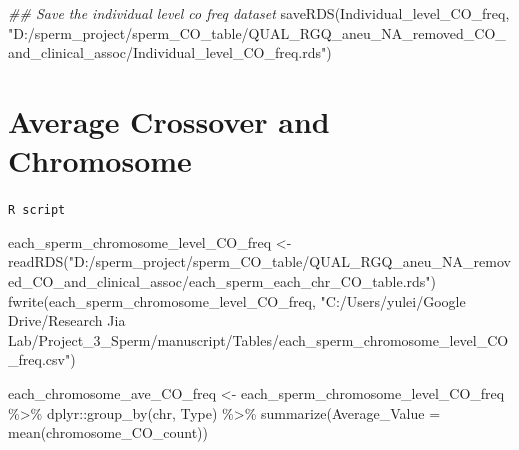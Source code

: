 \documentclass[
  letterpaper,
  DIV=11,
  numbers=noendperiod]{scrreprt}
\newenvironment{Shaded}{\begin{snugshade}}{\end{snugshade}}
\newcommand{\AttributeTok}[1]{\textcolor[rgb]{0.40,0.45,0.13}{#1}}
\newcommand{\DocumentationTok}[1]{\textcolor[rgb]{0.37,0.37,0.37}{\textit{#1}}}
\newcommand{\FunctionTok}[1]{\textcolor[rgb]{0.28,0.35,0.67}{#1}}
\newcommand{\NormalTok}[1]{\textcolor[rgb]{0.00,0.23,0.31}{#1}}
\newcommand{\OtherTok}[1]{\textcolor[rgb]{0.00,0.23,0.31}{#1}}
\newcommand{\SpecialCharTok}[1]{\textcolor[rgb]{0.37,0.37,0.37}{#1}}
\newcommand{\StringTok}[1]{\textcolor[rgb]{0.13,0.47,0.30}{#1}}
\begin{document}
\begin{codelisting}
\begin{Shaded}
\begin{Highlighting}[]
\DocumentationTok{\#\# Save the individual level co freq dataset}
\FunctionTok{saveRDS}\NormalTok{(Individual\_level\_CO\_freq, }\StringTok{"D:/sperm\_project/sperm\_CO\_table/QUAL\_RGQ\_aneu\_NA\_removed\_CO\_and\_clinical\_assoc/Individual\_level\_CO\_freq.rds"}\NormalTok{)}
\end{Highlighting}
\end{Shaded}

\end{codelisting}

\hypertarget{average-crossover-and-chromosome}{%
\section{Average Crossover and
Chromosome}\label{average-crossover-and-chromosome}}

\begin{codelisting}

\caption{\texttt{R script}}

\begin{Shaded}
\begin{Highlighting}[]
\NormalTok{each\_sperm\_chromosome\_level\_CO\_freq }\OtherTok{\textless{}{-}} \FunctionTok{readRDS}\NormalTok{(}\StringTok{"D:/sperm\_project/sperm\_CO\_table/QUAL\_RGQ\_aneu\_NA\_removed\_CO\_and\_clinical\_assoc/each\_sperm\_each\_chr\_CO\_table.rds"}\NormalTok{)}
\FunctionTok{fwrite}\NormalTok{(each\_sperm\_chromosome\_level\_CO\_freq,}
       \StringTok{"C:/Users/yulei/Google Drive/Research Jia Lab/Project\_3\_Sperm/manuscript/Tables/each\_sperm\_chromosome\_level\_CO\_freq.csv"}\NormalTok{)}

\NormalTok{each\_chromosome\_ave\_CO\_freq }\OtherTok{\textless{}{-}}\NormalTok{ each\_sperm\_chromosome\_level\_CO\_freq }\SpecialCharTok{\%\textgreater{}\%}\NormalTok{ dplyr}\SpecialCharTok{::}\FunctionTok{group\_by}\NormalTok{(chr, Type) }\SpecialCharTok{\%\textgreater{}\%} \FunctionTok{summarize}\NormalTok{(}\AttributeTok{Average\_Value =} \FunctionTok{mean}\NormalTok{(chromosome\_CO\_count))}


\end{Highlighting}
\end{Shaded}
\end{codelisting}
\end{document}

